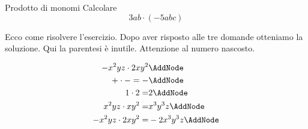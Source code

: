 \begin{esempiot}{Prodotto di monomi}{}
	Calcolare \[3ab\cdot(-5abc)\]
\end{esempiot}
Ecco come risolvere l'esercizio. Dopo aver risposto alle tre domande otteniamo la soluzione. Qui la parentesi è inutile. Attenzione al numero nascosto.
\begin{NodesList}[dy=3pt]
	\begin{align*}
		-x^2yz\cdot 2xy^2&\AddNode\\ %
		+\cdot -=-&\AddNode\\
		1\cdot 2=&2\AddNode\\
		x^2yz\cdot xy^2=&x^3y^3z\AddNode\\
		-x^2yz\cdot 2xy^2=&-2x^3y^3z\AddNode
	\end{align*}
\end{NodesList}
